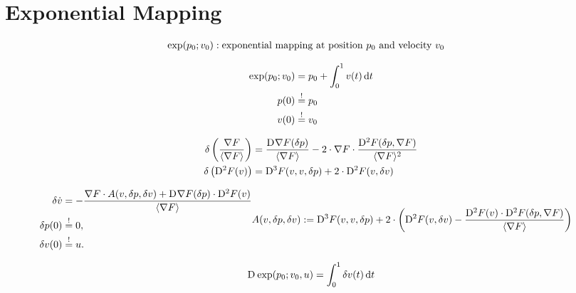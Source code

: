 \section{Exponential Mapping}


\begin{subequations}
\begin{align}
\exp( p_0; v_0 )  &:  \text{exponential mapping at position $ p_0 $ and velocity $ v_0 $}
\end{align}
\end{subequations}


\begin{subequations}
\begin{align}
\exp( p_0; v_0 )  &=  p_0  +  \int^1_0 v( t ) \,\mathrm{ d }{  t  }\\
p( 0 )  &\overset{ ! }{ = }   p_0\\
v( 0 )  &\overset{ ! }{ = }   v_0
\end{align}
\end{subequations}




\begin{subequations}
\begin{align}
\delta \left( \frac{ \nabla F  }{ \langle  \nabla F   \rangle } \right)  &=
\frac{ \mathrm{D}^{  } \nabla F  ( \delta p ) }{ \langle  \nabla F   \rangle }  -
2 \cdot \nabla F  \cdot \frac{ \mathrm{D}^{  2  } F ( \delta p, \nabla F  ) }{ \langle  \nabla F   \rangle^2 }\\
\delta\left( \mathrm{D}^{  2  } F ( v ) \right)  &=
\mathrm{D}^{  3  } F ( v, v, \delta p )  +
2 \cdot \mathrm{D}^{  2  } F ( v, \delta v )
\end{align}
\end{subequations}


\begin{subequations}
\begin{align}
\delta \dot{ v }   &=
- \frac{ \grad F \mult A( v, \delta p, \delta v  )
+  \diff{}{ \grad{ F } }( \delta p ) \mult \diff{ 2 }{ F }( v ) }{ \skaq{ \grad{ F } } } \\
\delta p( 0 )  &\overset{ ! }{ = }  0,\\
\delta v( 0 )  &\overset{ ! }{ = }  u.
\end{align}

\begin{align}
A( v, \delta p, \delta v  )  &:=
\diff{ 3 }{ F }( v, v, \delta p )  +
         2 \mult \left( \diff{ 2 }{ F }( v, \delta v ) -
                        \frac{ \diff{ 2 }{ F }( v ) \mult \diff{ 2 }{ F }( \delta p, \grad{ F } )
                                       }{ \skaq{ \grad{ F } } } \right)
\end{align}
\end{subequations}



\begin{align}
\mathrm{D}^{  } \exp( p_0; v_0, u )  =  \int^1_0 \delta v( t ) \,\mathrm{ d }{  t  }
\end{align}
